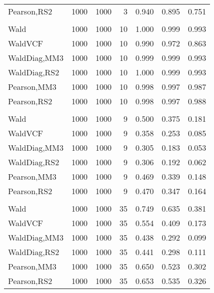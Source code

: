 \documentclass[
]{article}
\begin{document}
\begin{table}[H]
{\begin{tabular}[t]{lrrrrrr}
\hspace{1em}Pearson,RS2 & 1000 & 1000 & 3 & 0.940 & 0.895 & 0.751\\
\addlinespace[0.3em]
\multicolumn{7}{l}{\textbf{1F 15V}}\\
\hspace{1em}Wald & 1000 & 1000 & 10 & 1.000 & 0.999 & 0.993\\
\hspace{1em}WaldVCF & 1000 & 1000 & 10 & 0.990 & 0.972 & 0.863\\
\hspace{1em}WaldDiag,MM3 & 1000 & 1000 & 10 & 0.999 & 0.999 & 0.993\\
\hspace{1em}WaldDiag,RS2 & 1000 & 1000 & 10 & 1.000 & 0.999 & 0.993\\
\hspace{1em}Pearson,MM3 & 1000 & 1000 & 10 & 0.998 & 0.997 & 0.987\\
\hspace{1em}Pearson,RS2 & 1000 & 1000 & 10 & 0.998 & 0.997 & 0.988\\
\addlinespace[0.3em]
\multicolumn{7}{l}{\textbf{2F 10V}}\\
\hspace{1em}Wald & 1000 & 1000 & 9 & 0.500 & 0.375 & 0.181\\
\hspace{1em}WaldVCF & 1000 & 1000 & 9 & 0.358 & 0.253 & 0.085\\
\hspace{1em}WaldDiag,MM3 & 1000 & 1000 & 9 & 0.305 & 0.183 & 0.053\\
\hspace{1em}WaldDiag,RS2 & 1000 & 1000 & 9 & 0.306 & 0.192 & 0.062\\
\hspace{1em}Pearson,MM3 & 1000 & 1000 & 9 & 0.469 & 0.339 & 0.148\\
\hspace{1em}Pearson,RS2 & 1000 & 1000 & 9 & 0.470 & 0.347 & 0.164\\
\addlinespace[0.3em]
\multicolumn{7}{l}{\textbf{3F 15V}}\\
\hspace{1em}Wald & 1000 & 1000 & 35 & 0.749 & 0.635 & 0.381\\
\hspace{1em}WaldVCF & 1000 & 1000 & 35 & 0.554 & 0.409 & 0.173\\
\hspace{1em}WaldDiag,MM3 & 1000 & 1000 & 35 & 0.438 & 0.292 & 0.099\\
\hspace{1em}WaldDiag,RS2 & 1000 & 1000 & 35 & 0.441 & 0.298 & 0.111\\
\hspace{1em}Pearson,MM3 & 1000 & 1000 & 35 & 0.650 & 0.523 & 0.302\\
\hspace{1em}Pearson,RS2 & 1000 & 1000 & 35 & 0.653 & 0.535 & 0.326\\
\bottomrule
\end{tabular}}
\endgroup{}
\end{table}
\end{document}
